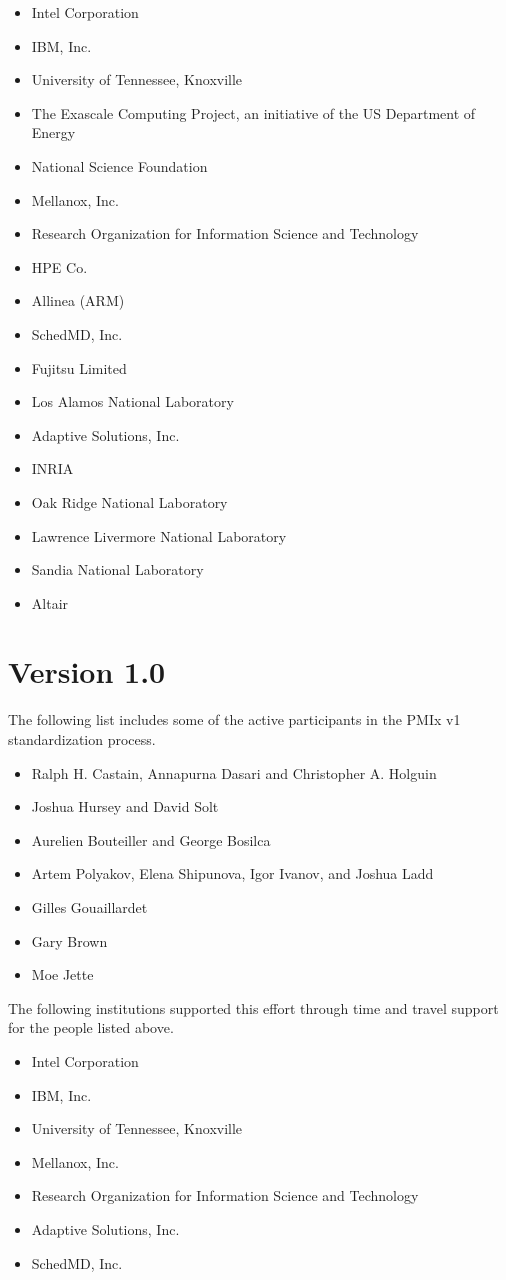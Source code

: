 \begin{itemize}
\item Intel Corporation
\item IBM, Inc.
\item University of Tennessee, Knoxville
\item The Exascale Computing Project, an initiative of the US Department of Energy
\item National Science Foundation
\item Mellanox, Inc.
\item Research Organization for Information Science and Technology
\item HPE Co.
\item Allinea (ARM)
\item SchedMD, Inc.
\item Fujitsu Limited
\item Los Alamos National Laboratory
\item Adaptive Solutions, Inc.
\item INRIA
\item Oak Ridge National Laboratory
\item Lawrence Livermore National Laboratory
\item Sandia National Laboratory
\item Altair
\end{itemize}


\section{Version 1.0}

The following list includes some of the active participants in the PMIx v1 standardization process.

\begin{itemize}
\item Ralph H. Castain, Annapurna Dasari and Christopher A. Holguin
\item Joshua Hursey and David Solt
\item Aurelien Bouteiller and George Bosilca
\item Artem Polyakov, Elena Shipunova, Igor Ivanov, and Joshua Ladd
\item Gilles Gouaillardet
\item Gary Brown
\item Moe Jette
\end{itemize}

The following institutions supported this effort through time and travel support for the people listed above.

\begin{itemize}
\item Intel Corporation
\item IBM, Inc.
\item University of Tennessee, Knoxville
\item Mellanox, Inc.
\item Research Organization for Information Science and Technology
\item Adaptive Solutions, Inc.
\item SchedMD, Inc.
\end{itemize}
